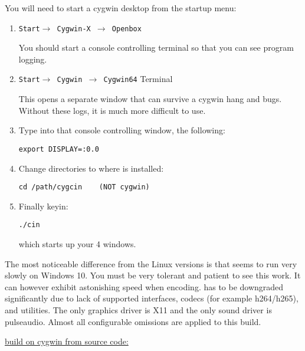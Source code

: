 You will need to start a cygwin desktop from the startup menu:
\begin{enumerate}
\item \texttt{Start$\rightarrow$ Cygwin-X $\rightarrow$ Openbox}

  You should start a console controlling terminal so that you can
  see program logging.

\item \texttt{Start$\rightarrow$ Cygwin $\rightarrow$ Cygwin64} Terminal

  This opens a separate window that can survive a cygwin hang and
  bugs. Without these logs, it is much more difficult to use.

\item Type into that console controlling window, the following:
\begin{lstlisting}[style=sh]
export DISPLAY=:0.0
\end{lstlisting}

\item Change directories to where \CGG{} is installed:
\begin{lstlisting}[style=sh]
cd /path/cygcin    (NOT cygwin)
\end{lstlisting}

\item Finally keyin:
\begin{lstlisting}[style=sh]
./cin
\end{lstlisting}
  which starts up your 4 \CGG{} windows.
\end{enumerate}

The most noticeable difference from the Linux versions is that
\CGG{} seems to run very slowly on Windows 10. You must be very
tolerant and patient to see this work.  It can however exhibit
astonishing speed when encoding.  \CGG{} has to be downgraded
significantly due to lack of supported interfaces, codecs (for
example h264/h265), and utilities.  The only graphics driver is
X11 and the only sound driver is pulseaudio.  Almost all
configurable omissions are applied to this build.

\underline{\CGG{} build on cygwin from source code:}

